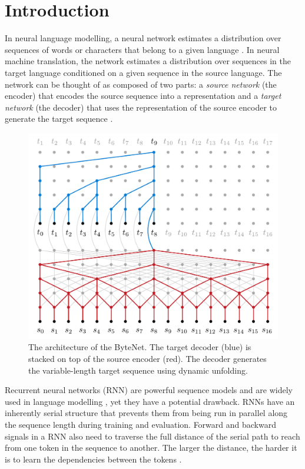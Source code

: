 \documentclass{article}
\begin{document}
\section{Introduction}


In neural language modelling, a neural network estimates a distribution over sequences of words or characters that belong to a given language \citep{bengio:2003}. In neural machine translation, the network estimates a distribution over sequences in the target language conditioned on a given sequence in the source language. The network can be thought of as composed of two parts: a \emph{source network} (the encoder) that encodes the source sequence into a representation and a \emph{target network} (the decoder) that uses the representation of the source encoder to generate the target sequence \citep{kalchbrenner13emnlp}.

\begin{figure}
\centering
\includegraphics[scale=.47]{architecture/detailed}
\caption{The architecture of the ByteNet. The target decoder (blue) is stacked on top of the source encoder (red). The decoder generates the variable-length target sequence using dynamic unfolding.}
\label{architecture}
\end{figure}

Recurrent neural networks (RNN) are powerful sequence models \citep{hochreiter1997long} and are widely used in language modelling \citep{DBLP:conf/interspeech/MikolovKBCK10}, yet they have a potential drawback. RNNs have an inherently serial structure that prevents them from being run in parallel along the sequence length during training and evaluation. Forward and backward signals in a RNN also need to traverse the full distance of the serial path to reach from one token in the sequence to another. The larger the distance, the harder it is to learn the dependencies between the tokens \citep{chapter-gradient-flow-2001}.
\end{document}
